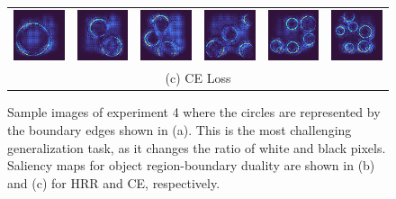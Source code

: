 \documentclass[letterpaper]{article} %
\begin{document}
\begin{figure}[!htbp]
\begin{tabular}{cccccc}
\multicolumn{1}{c}{\includegraphics[width=0.125\columnwidth]{saliency/ce/circle/ring_1.png}} \hspace{-12pt} &  \multicolumn{1}{c}{\includegraphics[width=0.125\columnwidth]{saliency/ce/circle/ring_2.png}} \hspace{-12pt} & \multicolumn{1}{c}{\includegraphics[width=0.125\columnwidth]{saliency/ce/circle/ring_3.png}} \hspace{-12pt} & \multicolumn{1}{c}{\includegraphics[width=0.125\columnwidth]{saliency/ce/circle/ring_4.png}} \hspace{-12pt} & \multicolumn{1}{c}{\includegraphics[width=0.125\columnwidth]{saliency/ce/circle/ring_5.png}} \hspace{-12pt} & \multicolumn{1}{c}{\includegraphics[width=0.125\columnwidth]{saliency/ce/circle/ring_6.png}} \\ 
\multicolumn{6}{c}{(c) CE Loss}
\end{tabular}
\caption{Sample images of experiment 4 where the circles are represented by the boundary edges shown in (a). This is the most challenging generalization task, as it changes the ratio of white and black pixels. Saliency maps for object region-boundary duality are shown in (b) and (c) for HRR and CE, respectively.}
\label{fig:exp_4_saliency}
\end{figure}
\end{document}
